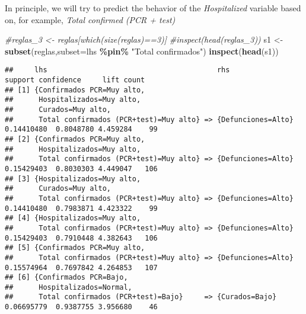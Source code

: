 \documentclass[
]{book}
\newenvironment{Shaded}{\begin{snugshade}}{\end{snugshade}}
\newcommand{\CommentTok}[1]{\textcolor[rgb]{0.56,0.35,0.01}{\textit{#1}}}
\newcommand{\DataTypeTok}[1]{\textcolor[rgb]{0.13,0.29,0.53}{#1}}
\newcommand{\KeywordTok}[1]{\textcolor[rgb]{0.13,0.29,0.53}{\textbf{#1}}}
\newcommand{\NormalTok}[1]{#1}
\newcommand{\OperatorTok}[1]{\textcolor[rgb]{0.81,0.36,0.00}{\textbf{#1}}}
\newcommand{\StringTok}[1]{\textcolor[rgb]{0.31,0.60,0.02}{#1}}
\begin{document}
In principle, we will try to predict the behavior of the \emph{Hospitalized} variable based on, for example, \emph{Total confirmed (PCR + test)}

\begin{Shaded}
\begin{Highlighting}[]
\CommentTok{\#reglas\_3 \textless{}{-} reglas[which(size(reglas)==3)]}
\CommentTok{\#inspect(head(reglas\_3))}
\NormalTok{s1 \textless{}{-}}\StringTok{ }\KeywordTok{subset}\NormalTok{(reglas,}\DataTypeTok{subset=}\NormalTok{lhs }\OperatorTok{\%pin\%}\StringTok{ "Total confirmados"}\NormalTok{)}
\KeywordTok{inspect}\NormalTok{(}\KeywordTok{head}\NormalTok{(s1))}
\end{Highlighting}
\end{Shaded}

\begin{verbatim}
##     lhs                                        rhs                   support confidence     lift count
## [1] {Confirmados PCR=Muy alto,                                                                        
##      Hospitalizados=Muy alto,                                                                         
##      Curados=Muy alto,                                                                                
##      Total confirmados (PCR+test)=Muy alto} => {Defunciones=Alto} 0.14410480  0.8048780 4.459284    99
## [2] {Confirmados PCR=Muy alto,                                                                        
##      Hospitalizados=Muy alto,                                                                         
##      Total confirmados (PCR+test)=Muy alto} => {Defunciones=Alto} 0.15429403  0.8030303 4.449047   106
## [3] {Hospitalizados=Muy alto,                                                                         
##      Curados=Muy alto,                                                                                
##      Total confirmados (PCR+test)=Muy alto} => {Defunciones=Alto} 0.14410480  0.7983871 4.423322    99
## [4] {Hospitalizados=Muy alto,                                                                         
##      Total confirmados (PCR+test)=Muy alto} => {Defunciones=Alto} 0.15429403  0.7910448 4.382643   106
## [5] {Confirmados PCR=Muy alto,                                                                        
##      Total confirmados (PCR+test)=Muy alto} => {Defunciones=Alto} 0.15574964  0.7697842 4.264853   107
## [6] {Confirmados PCR=Bajo,                                                                            
##      Hospitalizados=Normal,                                                                           
##      Total confirmados (PCR+test)=Bajo}     => {Curados=Bajo}     0.06695779  0.9387755 3.956680    46
\end{verbatim}
\end{document}
